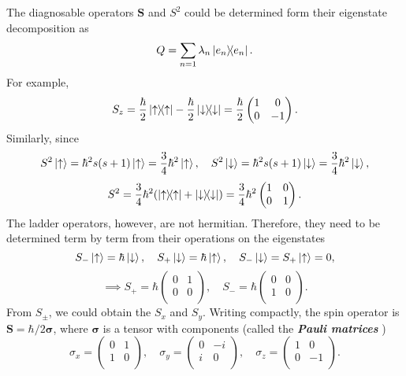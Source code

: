 \documentclass{article}
\newcommand{\up}{\ket{\uparrow}} %
\newcommand{\dn}{\ket{\downarrow}} %
\theoremstyle{nonumberplain}
\begin{document}
The diagnosable operators $\mathbf{S}$ and $S^2$ could be determined form their eigenstate decomposition as
\[
    Q = \sum\limits_{n=1} \lambda_n \dyad{e_n}.
\]
For example, 
\[
    S_z = \frac{\hbar}{2} \dyad{\uparrow} - \frac{\hbar}{2} \dyad{\downarrow} = \frac{\hbar}{2} \begin{pmatrix}
        1 &  0 \\
        0 &  -1 \\
    \end{pmatrix}.
\]
Similarly, since 
\[
    S^2 \up = \hbar ^2 s(s+1) \up = \frac{3}{4}\hbar ^2 \up, 
    \quad 
    S^2 \dn = \hbar ^{2}  s(s+1) \dn = \frac{3}{4} \hbar ^{2} \dn,
\]
\[
    S^2 = \frac{3}{4}\hbar ^2 (\dyad{\uparrow} + \dyad{\downarrow})
    = \frac{3}{4}\hbar ^2 \begin{pmatrix}
        1 & 0 \\
        0 &  1 \\
    \end{pmatrix}. 
\]
The ladder operators, however, are not hermitian. Therefore, they need to be determined term by term from their operations on the eigenstates 
\[
    S_- \up = \hbar  \dn, \quad 
    S_+ \dn = \hbar  \up, \quad 
    S_- \dn = S_+ \up = 0, 
\]
\[
    \implies  
    S_+ = \hbar \begin{pmatrix}
        0 &  1 \\
        0 &  0 \\
    \end{pmatrix}, \quad 
    S_- = \hbar  \begin{pmatrix}
        0 &  0 \\
        1 &  0 \\
    \end{pmatrix}.
\]
From $S_{\pm}$, we could obtain the $S_x$ and $S_{y} $. Writing compactly, the spin operator is $\mathbf{S} = \hbar  /2 \mathbf{\sigma}$, where $\mathbf{\sigma} $ is a tensor with components (called the \textit{\textbf{Pauli matrices}} )
\[\boxed{
    \sigma _x = \begin{pmatrix}
        0 &  1 \\
        1 &  0 \\
    \end{pmatrix}, \quad 
    \sigma _y = \begin{pmatrix}
        0 &  -i \\
        i &  0 \\
    \end{pmatrix}, \quad 
    \sigma _z = \begin{pmatrix}
        1 &  0 \\
        0 &  -1 \\
    \end{pmatrix}. }
\]
\end{document}
